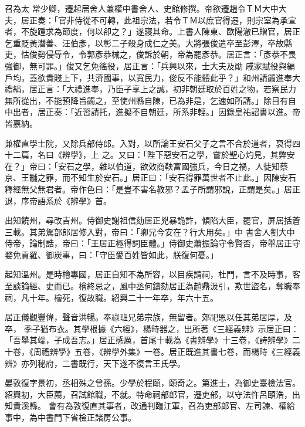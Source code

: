 \begin{pinyinscope}
 召為太
 常少卿，遷起居舍人兼權中書舍人、史館修撰。帝欲遷趙令ＴＭ大中大夫，居正奏：「官非侍從不可轉，此祖宗法，若令ＴＭ以庶官得遷，則宗室為承宣者，不旋踵求為節度，何以卻之？」遂寢其命。上書人陳東、歐陽澈已贈官，居正乞重貶黃潛善、汪伯彥，以彰二子殺身成仁之美。大將張俊遣卒至彭澤，卒故縣吏，怙俊勢侵辱令，令郭彥恭械之，俊訴於朝，帝為罷彥恭。居正言：「彥恭不畏強御，無可罪。」俊又乞免徭役，居正言：「兵興以來，士大夫及勛
 戚家賦役與編戶均，蓋欲貴賤上下，共濟國事，以寬民力，俊反不能體此乎？」和州請蠲進奉大禮絹，居正言：「大禮進奉，乃臣子享上之誠，初非朝廷取於百姓之物，若察民力無所從出，不能預降旨蠲之，至使州縣自陳，已為非是，乞速如所請。」除目有自中出者，居正奏：「近習請托，進擬不自朝廷，所系非輕。」因錄皇祐詔書以進。帝皆嘉納。



 兼權直學士院，又除兵部侍郎。入對，以所論王安石父子之言不合於道者，裒得四十二篇，名曰《辨學》，上
 之。又曰：「陛下惡安石之學，嘗於聖心灼見，其弊安在？」帝曰：「安石之學，雜以伯道，欲效商鞅富國強兵，今日之禍，人徒知蔡京、王黼之罪，而不知生於安石。」居正曰：「安石得罪萬世者不止此。」因陳安石釋經無父無君者。帝作色曰：「是豈不害名教邪？孟子所謂邪說，正謂是矣。」居正退，序帝語系於《辨學》首。



 出知饒州，尋改吉州。侍御史謝祖信劾居正兇暴詭詐，傾陷大臣，罷官，屏居括蒼三載。其弟駕部郎居修入對，帝曰：「卿兄今安在？行大用矣。」中
 書舍人劉大中侍帝，論制誥，帝曰：「王居正極得詞臣體。」侍御史蕭振論守令賢否，帝舉居正守婺免貢羅、御炭事，曰：「守臣愛百姓皆如此，朕復何憂。」



 起知溫州。是時檜專國，居正自知不為所容，以目疾請祠，杜門，言不及時事，客至談論經、史而已。檜終忌之，風中丞何鑄劾居正為趙鼎汲引，欺世盜名，奪職奉祠，凡十年。檜死，復故職。紹興二十一年卒，年六十五。



 居正儀觀豐偉，聲音洪暢。奉祿班兄弟宗族，無留者。郊祀恩以任其弟居厚，及卒，
 季子猶布衣。其學根據《六經》，楊時器之，出所著《三經義辨》示居正曰：「吾舉其端，子成吾志。」居正感厲，首尾十載為《書辨學》十三卷，《詩辨學》二十卷，《周禮辨學》五卷，《辨學外集》一卷。居正既進其書七卷，而楊時《三經義辨》亦列秘府，二書既行，天下遂不復言王氏學。



 晏敦復字景初，丞相殊之曾孫。少學於程頤，頤奇之。第進士，為御史臺檢法官。紹興初，大臣薦，召試館職，不就。特命祠部郎官，遷吏部，以守法忤呂頤浩，出知貴溪縣。
 會有為敦復直其事者，改通判臨江軍，召為吏部郎官、左司諫、權給事中，為中書門下省檢正諸房公事。




\end{pinyinscope}
